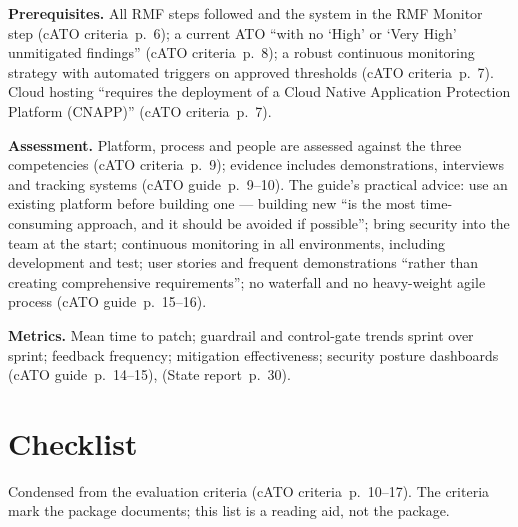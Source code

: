 \documentclass[11pt,letterpaper,twoside,openany]{memoir}
\newcommand{\pg}[2]{{\small(#1~p.~#2)}}          %
\begin{document}
\textbf{Prerequisites.} All RMF steps followed and the system in the RMF Monitor step \pg{cATO criteria}{6}; a current
ATO ``with no `High' or `Very High' unmitigated findings'' \pg{cATO criteria}{8}; a robust continuous monitoring
strategy with automated triggers on approved thresholds \pg{cATO criteria}{7}. Cloud hosting ``requires the deployment
of a Cloud Native Application Protection Platform (CNAPP)'' \pg{cATO criteria}{7}.

\textbf{Assessment.} Platform, process and people are assessed against the three competencies \pg{cATO criteria}{9};
evidence includes demonstrations, interviews and tracking systems \pg{cATO guide}{9--10}. The guide's practical advice:
use an existing platform before building one --- building new ``is the most time-consuming approach, and it should be
avoided if possible''; bring security into the team at the start; continuous monitoring in all environments, including
development and test; user stories and frequent demonstrations ``rather than creating comprehensive requirements''; no
waterfall and no heavy-weight agile process \pg{cATO guide}{15--16}.

\textbf{Metrics.} Mean time to patch; guardrail and control-gate trends sprint over sprint; feedback frequency;
mitigation effectiveness; security posture dashboards \pg{cATO guide}{14--15}, \pg{State report}{30}.

\section{Checklist}
Condensed from the evaluation criteria \pg{cATO criteria}{10--17}. The criteria mark the package documents; this list
is a reading aid, not the package.
\end{document}
